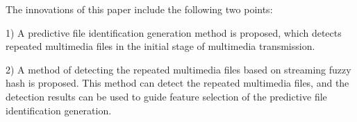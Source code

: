 The innovations of this paper include the following two points:

1) A predictive file identification generation method is proposed, which detects repeated multimedia files in the initial stage of multimedia transmission.

2) A method of detecting the repeated multimedia files based on streaming fuzzy hash is proposed. This method can detect the repeated multimedia files, and the detection results can be used to guide feature selection of the predictive file identification generation.

